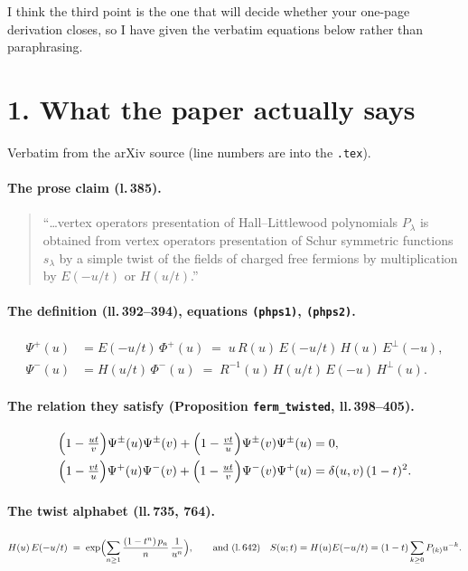 \documentclass[11pt,a4paper]{article}
\begin{document}
I think the third point is the one that will decide whether your one-page derivation
closes, so I have given the verbatim equations below rather than paraphrasing.

\section*{1. What the paper actually says}

Verbatim from the arXiv source (line numbers are into the \texttt{.tex}).

\paragraph{The prose claim (l.\,385).}
\begin{quote}
``\ldots vertex operators presentation of Hall--Littlewood polynomials $P_\lambda$
is obtained from vertex operators presentation of Schur symmetric functions
$s_\lambda$ by a simple twist of the fields of charged free fermions by
multiplication by $E(-u/t)$ or $H(u/t)$.''
\end{quote}

\paragraph{The definition (ll.\,392--394), equations \texttt{(phps1)}, \texttt{(phps2)}.}
\begin{align}
\Psi^+(u) &= E(-u/t)\,\Phi^+(u) \;=\; u\,R(u)\,E(-u/t)\,H(u)\,E^{\perp}(-u),\\
\Psi^-(u) &= H(u/t)\,\Phi^-(u) \;=\; R^{-1}(u)\,H(u/t)\,E(-u)\,H^{\perp}(u).
\end{align}

\paragraph{The relation they satisfy (Proposition \texttt{ferm\_twisted}, ll.\,398--405).}
\begin{align}
\Bigl(1-\tfrac{ut}{v}\Bigr)\Psi^\pm(u)\Psi^\pm(v)
  + \Bigl(1-\tfrac{vt}{u}\Bigr)\Psi^\pm(v)\Psi^\pm(u) &= 0,\\
\Bigl(1-\tfrac{vt}{u}\Bigr)\Psi^+(u)\Psi^-(v)
  + \Bigl(1-\tfrac{ut}{v}\Bigr)\Psi^-(v)\Psi^+(u) &= \delta(u,v)\,(1-t)^2.
\end{align}

\paragraph{The twist alphabet (ll.\,735, 764).}
\begin{equation}
H(u)\,E(-u/t) \;=\; \exp\Bigl(\sum_{n\ge1}\frac{(1-t^{n})\,p_n}{n}\,\frac{1}{u^{n}}\Bigr),
\qquad\text{and (l.\,642)}\quad
S(u;t)=H(u)E(-u/t)=(1-t)\sum_{k\ge0}P_{(k)}u^{-k}.
\end{equation}
\end{document}
